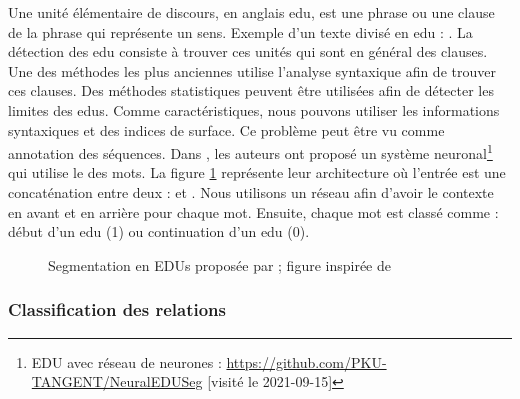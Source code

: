 \documentclass{KodeBook}
\begin{document}
Une unité élémentaire de discours, en anglais \ac{edu}, est une phrase ou une clause de la phrase qui représente un sens. 
Exemple d'un texte divisé en \ac{edu} : . 
La détection des \ac{edu} consiste à trouver ces unités qui sont en général des clauses. 
Une des méthodes les plus anciennes utilise l'analyse syntaxique afin de trouver ces clauses. 
Des méthodes statistiques peuvent être utilisées afin de détecter les limites des \ac{edu}s. 
Comme caractéristiques, nous pouvons utiliser les informations syntaxiques et des indices de surface. 
Ce problème peut être vu comme annotation des séquences. 
Dans \cite{2018-wang-al}, les auteurs ont proposé un système neuronal\footnote{EDU avec réseau de neurones : \url{https://github.com/PKU-TANGENT/NeuralEDUSeg} [visité le 2021-09-15]} qui utilise le  des mots. 
La figure \ref{fig:edu-embedding} représente leur architecture où l'entrée est une concaténation entre deux  :  et . 
Nous utilisons un réseau  afin d'avoir le contexte en avant et en arrière pour chaque mot. 
Ensuite, chaque mot est classé comme : début d'un \ac{edu} (1) ou continuation d'un \ac{edu} (0). 

\begin{figure}[!ht]
	\centering
	\caption[Segmentation en EDUs par embeddings]{Segmentation en EDUs proposée par \citet{2018-wang-al} ; figure inspirée de \cite{2019-jurafsky-martin}}
	\label{fig:edu-embedding}
\end{figure}

\subsubsection{Classification des relations}
\end{document}
